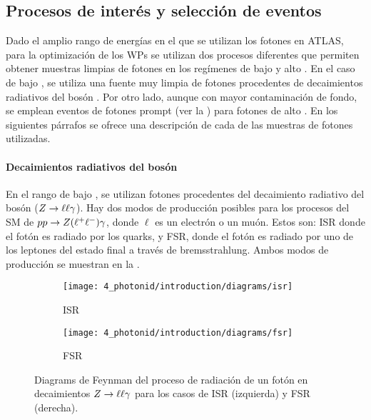 \subsection{Procesos de inter\'es y selecci\'on de eventos}
\label{subsec:pid_ss:pid:event_selection}

Dado el amplio rango de energ\'ias en el que se utilizan los fotones en \ac{ATLAS}, para la optimización de los \acp{WP} se utilizan dos procesos diferentes que permiten obtener muestras limpias de fotones en los regímenes de bajo y alto \pt. En el caso de bajo \pt, se utiliza una fuente muy limpia de fotones procedentes de decaimientos radiativos del bos\'on \Zboson. Por otro lado, aunque con mayor contaminación de fondo, se emplean eventos de fotones prompt (ver la \Sect{\ref{subsec:theory:sm:prompt_photon}}) para fotones de alto \pt. En los siguientes párrafos se ofrece una descripción de cada de las muestras de fotones utilizadas.


\paragraph{Decaimientos radiativos del bos\'on \Zboson}

En el rango de bajo \pt, se utilizan fotones procedentes del decaimiento radiativo del bosón \Zboson (\(Z \rightarrow \ell\ell \gamma\)). Hay dos modos de producción posibles para los procesos del \ac{SM} de \(pp\rightarrow Z(\ell^{+} \ell^{-})\gamma\), donde \(\ell\) es un electrón o un mu\'on. Estos son: \acf{ISR} donde el fotón es radiado por los quarks, y \acf{FSR}, donde el fotón es radiado por uno de los leptones del estado final a través de bremsstrahlung. Ambos modos de producción se muestran en la \Fig{\ref{fig:pid_ss:event_selection:fsr_isr}}.


\begin{figure}[ht!]
    \centering
    \begin{subfigure}[h]{0.49\linewidth}
        \centering
        \texttt{[image: 4\_photonid/introduction/diagrams/isr]}
        \caption{\acf{ISR}}
    \end{subfigure}
    \hfill
    \begin{subfigure}[h]{0.49\linewidth}
        \centering
        \texttt{[image: 4\_photonid/introduction/diagrams/fsr]}
        \caption{\acf{FSR}}
    \end{subfigure}
    \caption{Diagrams de Feynman del proceso de radiaci\'on de un fot\'on en decaimientos \(Z\rightarrow\ell\ell\gamma\) para los casos de \ac{ISR} (izquierda) y \ac{FSR} (derecha).}
    \label{fig:pid_ss:event_selection:fsr_isr}
\end{figure}


